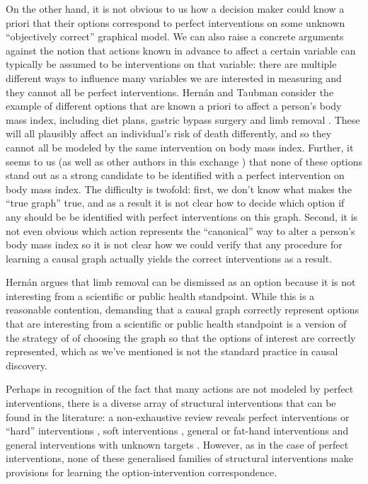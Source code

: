 \documentclass[USenglish,onecolumn]{article}
\begin{document}
On the other hand, it is not obvious to us how a decision maker could know a priori that their options correspond to perfect interventions on some unknown ``objectively correct'' graphical model. We can also raise a concrete arguments against the notion that actions known in advance to affect a certain variable can typically be assumed to be interventions on that variable: there are multiple different ways to influence many variables we are interested in measuring and they cannot all be perfect interventions. Hernán and Taubman consider the example of different options that are known a priori to affect a person's body mass index, including diet plans, gastric bypass surgery and limb removal \citep{hernan_does_2008,noauthor_does_2016}. These will all plausibly affect an individual's risk of death differently, and so they cannot all be modeled by the same intervention on body mass index. Further, it seems to us (as well as other authors in this exchange \citep{pearl_does_2018,hernanInvitedCommentaryCausal2009,shahar_association_2009}) that none of these options stand out as a strong candidate to be identified with a perfect intervention on body mass index. The difficulty is twofold: first, we don't know what makes the ``true graph'' true, and as a result it is not clear how to decide which option if any should be be identified with perfect interventions on this graph. Second, it is not even obvious which action represents the ``canonical'' way to alter a person's body mass index so it is not clear how we could verify that any procedure for learning a causal graph actually yields the correct interventions as a result.

Hernán argues that limb removal can be dismissed as an option because it is not interesting from a scientific or public health standpoint. While this is a reasonable contention, demanding that a causal graph correctly represent options that are interesting from a scientific or public health standpoint is a version of the strategy of of choosing the graph so that the options of interest are correctly represented, which as we've mentioned is not the standard practice in causal discovery.

Perhaps in recognition of the fact that many actions are not modeled by perfect interventions, there is a diverse array of structural interventions that can be found in the literature: a non-exhaustive review reveals perfect interventions or ``hard'' interventions \citep[ch. ~1]{pearl_causality:_2009,hauser_characterization_2012}, soft interventions \citep{correa_calculus_2020,eberhardt_interventions_2007}, general or fat-hand interventions \citep{eberhardt_interventions_2007,yang_characterizing_2018,glymour_evaluating_2017} and general interventions with unknown targets \citep{brouillard_differentiable_2020}. However, as in the case of perfect interventions, none of these generalised families of structural interventions make provisions for learning the option-intervention correspondence.
\end{document}
